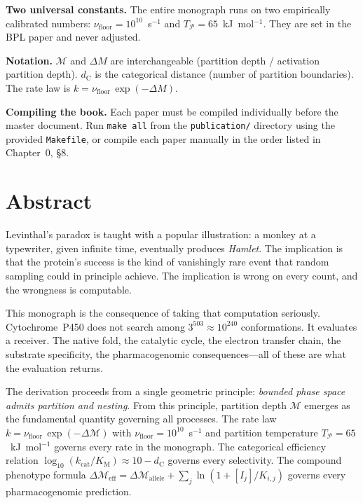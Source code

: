 \documentclass[11pt,a4paper,openany,twoside]{book}
\theoremstyle{definition}
\theoremstyle{remark}
\newcommand{\Depth}{\mathcal{M}}
\newcommand{\Part}{\mathcal{P}}
\newcommand{\dC}{d_{\mathrm{C}}}
\newcommand{\kcat}{k_{\mathrm{cat}}}
\newcommand{\KM}{K_{\mathrm{M}}}
\newcommand{\nufloor}{\nu_{\mathrm{floor}}}
\newcommand{\Tpart}{T_{\Part}}
\begin{document}
\noindent\textbf{Two universal constants.}
The entire monograph runs on two empirically calibrated numbers:
$\nufloor = 10^{10}$~s$^{-1}$ and $\Tpart = 65$~kJ~mol$^{-1}$.
They are set in the BPL paper and never adjusted.

\noindent\textbf{Notation.}
$\Depth$ and $\Delta M$ are interchangeable (partition depth / activation
partition depth).  $\dC$ is the categorical distance (number of partition
boundaries).  The rate law is $k = \nufloor\,\exp(-\Delta M)$.

\noindent\textbf{Compiling the book.}
Each paper must be compiled individually before the master document.  Run
\texttt{make all} from the \texttt{publication/} directory using the
provided \texttt{Makefile}, or compile each paper manually in the order
listed in Chapter~0, §8.

\cleardoublepage

\chapter*{Abstract}

\noindent Levinthal's paradox is taught with a popular illustration: a monkey
at a typewriter, given infinite time, eventually produces \textit{Hamlet}.
The implication is that the protein's success is the kind of vanishingly rare
event that random sampling could in principle achieve.  The implication is
wrong on every count, and the wrongness is computable.

\medskip
\noindent This monograph is the consequence of taking that computation
seriously.  Cytochrome~P450 does not search among $3^{503} \approx 10^{240}$
conformations.  It evaluates a receiver.  The native fold, the catalytic
cycle, the electron transfer chain, the substrate specificity, the
pharmacogenomic consequences---all of these are what the evaluation returns.

\medskip
\noindent The derivation proceeds from a single geometric principle:
\emph{bounded phase space admits partition and nesting}.  From this principle,
partition depth $\Depth$ emerges as the fundamental quantity governing all
processes.  The rate law $k = \nufloor\,\exp(-\Delta\Depth)$ with
$\nufloor = 10^{10}$~s$^{-1}$ and partition temperature
$\Tpart = 65$~kJ~mol$^{-1}$ governs every rate in the monograph.  The
categorical efficiency relation $\log_{10}(\kcat/\KM) \approx 10 - \dC$
governs every selectivity.  The compound phenotype formula
$\Delta\Depth_{\mathrm{eff}} = \Delta\Depth_{\mathrm{allele}} +
\sum_j \ln(1 + [I_j]/K_{i,j})$ governs every pharmacogenomic prediction.
\end{document}

